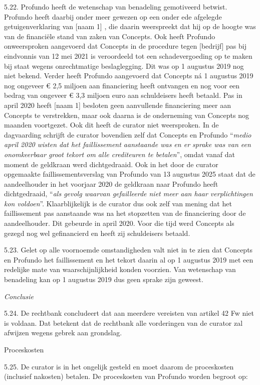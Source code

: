 \documentclass[
  dutch,
  a4paper,
]{article}
\begin{document}
5.22. Profundo heeft de wetenschap van benadeling gemotiveerd betwist. Profundo heeft daarbij onder meer gewezen op een onder ede afgelegde getuigenverklaring van {[}naam 1{]} , die daarin weerspreekt dat hij op de hoogte was van de financiële stand van zaken van Concepts. Ook heeft Profundo onweersproken aangevoerd dat Concepts in de procedure tegen {[}bedrijf{]} pas bij eindvonnis van 12 mei 2021 is veroordeeld tot een schadevergoeding op te maken bij staat wegens onrechtmatige beslaglegging. Dit was op 1 augustus 2019 nog niet bekend. Verder heeft Profundo aangevoerd dat Concepts ná 1 augustus 2019 nog ongeveer € 2,5 miljoen aan financiering heeft ontvangen en nog voor een bedrag van ongeveer € 3,3 miljoen euro aan schuldeisers heeft betaald. Pas in april 2020 heeft {[}naam 1{]} besloten geen aanvullende financiering meer aan Concepts te verstrekken, maar ook daarna is de onderneming van Concepts nog maanden voortgezet. Ook dit heeft de curator niet weersproken. In de dagvaarding schrijft de curator bovendien zelf dat Concepts en Profundo ``\emph{medio april 2020 wisten dat het faillissement aanstaande was en er sprake was van een onomkeerbaar groot tekort om alle crediteuren te betalen}'', omdat vanaf dat moment de geldkraan werd dichtgedraaid. Ook in het door de curator opgemaakte faillissementsverslag van Profundo van 13 augustus 2025 staat dat de aandeelhouder in het voorjaar 2020 de geldkraan naar Profundo heeft dichtgedraaid, ``\emph{als gevolg waarvan gefailleerde niet meer aan haar verplichtingen kon voldoen}''. Klaarblijkelijk is de curator dus ook zelf van mening dat het faillissement pas aanstaande was na het stopzetten van de financiering door de aandeelhouder. Dit gebeurde in april 2020. Voor die tijd werd Concepts als gezegd nog wel gefinancierd en heeft zij schuldeisers betaald.

5.23. Gelet op alle voornoemde omstandigheden valt niet in te zien dat Concepts en Profundo het faillissement en het tekort daarin al op 1 augustus 2019 met een redelijke mate van waarschijnlijkheid konden voorzien. Van wetenschap van benadeling kan op 1 augustus 2019 dus geen sprake zijn geweest.

\emph{Conclusie}

5.24. De rechtbank concludeert dat aan meerdere vereisten van artikel 42 Fw niet is voldaan. Dat betekent dat de rechtbank alle vorderingen van de curator zal afwijzen wegens gebrek aan grondslag.

Proceskosten

5.25. De curator is in het ongelijk gesteld en moet daarom de proceskosten (inclusief nakosten) betalen. De proceskosten van Profundo worden begroot op:
\end{document}
